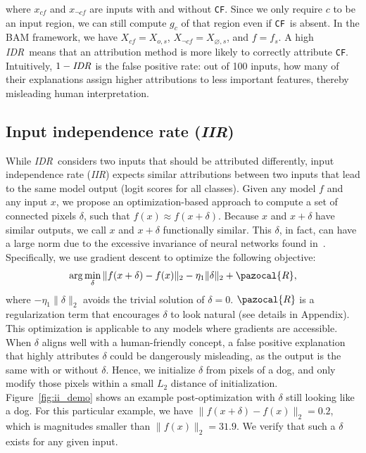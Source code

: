 \documentclass[twoside]{article}
\newcommand{\CF}{\texttt{CF}}
\newcommand{\IDR}{\textit{IDR}}
\newcommand{\IIR}{\textit{IIR}}
\begin{document}
where $x_{cf}$ and $x_{\neg cf}$ are inputs with and without \CF. Since we only require $c$ to be an input region, we can still compute $g_c$ of that region even if \CF~is absent. In the BAM framework, we have $X_{cf} = X_{o, s}$, $X_{\neg cf} = X_{\varnothing, s}$, and $f = f_s$. A high \IDR~means that an attribution method is more likely to correctly attribute \CF. Intuitively, $1-\textrm{\IDR}$ is the false positive rate: out of 100 inputs, how many of their explanations assign higher attributions to less important features, thereby misleading human interpretation. 

\subsection{Input independence rate (\IIR)} \label{sec:method_ii}
While \IDR~considers two inputs that should be attributed differently, input independence rate (\IIR) expects similar attributions between two inputs that lead to the same model output (logit scores for all classes). Given any model $f$ and any input $x$, we propose an optimization-based approach to compute a set of connected pixels $\delta$, such that $f(x) \approx f(x+\delta)$. Because $x$ and $x+\delta$ have similar outputs, we call $x$ and $x+\delta$ functionally similar. This $\delta$, in fact, can have a large norm due to the excessive invariance of neural networks found in~\citet{Jacobsen18, Engstrom19}. Specifically, we use gradient descent to optimize the following objective:
$$ \arg\min_\delta \|f(x+\delta)-f(x)\|_2 - \eta_1\|\delta\|_2 + \pazocal{R},$$
where $-\eta_1\|\delta\|_2$ avoids the trivial solution of $\delta=0$. $\pazocal{R}$ is a regularization term that encourages $\delta$ to look natural (see details in Appendix). This optimization is applicable to any models where gradients are accessible. When $\delta$ aligns well with a human-friendly concept, a false positive explanation that highly attributes $\delta$ could be dangerously misleading, as the output is the same with or without $\delta$. Hence, we initialize $\delta$ from pixels of a dog, and only modify those pixels within a small $L_2$ distance of initialization. Figure~\ref{fig:ii_demo} shows an example post-optimization with $\delta$ still looking like a dog. For this particular example, we have $\|f(x+\delta)-f(x)\|_2 = 0.2$, which is magnitudes smaller than $\|f(x)\|_2 = 31.9$. We verify that such a $\delta$ exists for any given input.
\end{document}

